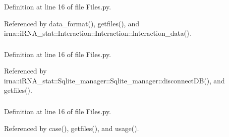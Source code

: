 \-Definition at line 16 of file \-Files.\-py.



\-Referenced by data\-\_\-format(), getfiles(), and irna\-::i\-R\-N\-A\-\_\-stat\-::\-Interaction\-::\-Interaction\-::\-Interaction\-\_\-data().

\hypertarget{classirna_1_1iRNA__stat_1_1Files_1_1Files_a529063572221b6a7c72ad0045e7dfb7c}{
\subsubsection[{fastmode}]{}}
\label{classirna_1_1iRNA__stat_1_1Files_1_1Files_a529063572221b6a7c72ad0045e7dfb7c}


\-Definition at line 16 of file \-Files.\-py.



\-Referenced by irna\-::i\-R\-N\-A\-\_\-stat\-::\-Sqlite\-\_\-manager\-::\-Sqlite\-\_\-manager\-::disconnect\-D\-B(), and getfiles().

\hypertarget{classirna_1_1iRNA__stat_1_1Files_1_1Files_a07eb296378b4298cd1ef40353b732864}{
\subsubsection[{i\-R\-N\-A\-\_\-db}]{}}
\label{classirna_1_1iRNA__stat_1_1Files_1_1Files_a07eb296378b4298cd1ef40353b732864}


\-Definition at line 16 of file \-Files.\-py.



\-Referenced by case(), getfiles(), and usage().

\hypertarget{classirna_1_1iRNA__stat_1_1Files_1_1Files_a98828dcf876bccd508c70d07d3341672}{
\subsubsection[{myrank}]{}}
\label{classirna_1_1iRNA__stat_1_1Files_1_1Files_a98828dcf876bccd508c70d07d3341672}


